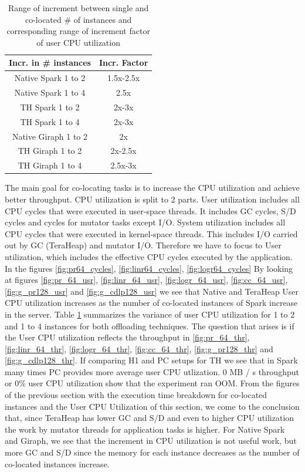 \begin{table}[thbp]
  \centering
  \caption{Range of increment between single and co-located \# of instances and corresponding range of increment factor of user CPU utilization}
  \label{tab:user_factors}
  \begin{tabular}{|c|c|}
    \hline
    \textbf{Incr. in # instances} & \textbf{Incr. Factor} \\
    \hline
    Native Spark 1 to 2  & 1.5x-2.5x \\
    Native Spark 1 to 4 & 2.5x \\
    TH Spark 1 to 2 & 2x-3x \\
    TH Spark 1 to 4 & 2x-3x \\
    Native Giraph 1 to 2 & 2x \\
    TH Giraph 1 to 2 & 2x-2.5x \\
    TH Giraph 1 to 4 & 2.5x-3x \\
    \hline
  \end{tabular}
\end{table}


The main goal for co-locating tasks is to increase the CPU utilization and achieve better
throughput. CPU utilization is split to 2 parts. 
User utilization includes all CPU cycles that were executed in user-space threads.
It includes GC cycles, S/D cycles and cycles for mutator tasks except I/O.
System utilization includes all CPU cycles that were executed in kernel-space threads.
This includes I/O carried out by GC (TeraHeap) and mutator I/O.
Therefore we have to focus to User utilization, which includes the effective CPU cycles executed by the application.
In the figures \ref{fig:pr64_cycles}, \ref{fig:linr64_cycles}, \ref{fig:logr64_cycles}
By looking at figures \ref{fig:pr_64_usr}, \ref{fig:linr_64_usr},
\ref{fig:logr_64_usr}, \ref{fig:cc_64_usr}, \ref{fig:g_pr128_usr} and \ref{fig:g_cdlp128_usr} we see that Native and TeraHeap User CPU utilization increases as the number of co-located instances of Spark increase in the server.
Table \ref{tab:user_factors} summarizes the variance of user CPU utilization for 1 to 2 and 1 to 4 instances for both offloading techniques.
The question that arises is if the User CPU utilization reflects the throughput in \ref{fig:pr_64_thr}, \ref{fig:linr_64_thr},
\ref{fig:logr_64_thr}, \ref{fig:cc_64_thr}, \ref{fig:g_pr128_thr} and \ref{fig:g_cdlp128_thr}. If comparing H1 and PC setups for TH we see that in Spark many times PC provides more average user CPU utlization. 0 MB / s throughput or 0\% user CPU utilization show that the experiment ran OOM.
From the figures of the previous section with the execution time breakdown for co-located instances and the User CPU Utilization of this section, we come to the conclusion that, since TeraHeap has lower GC and S/D and even to higher CPU utilization the work by mutator threads for application tasks is higher.
For Native Spark and Giraph, we see that the increment in CPU utilization is not useful work, but more GC and S/D since the memory for each instance decreases as the number of co-located instances increase.


